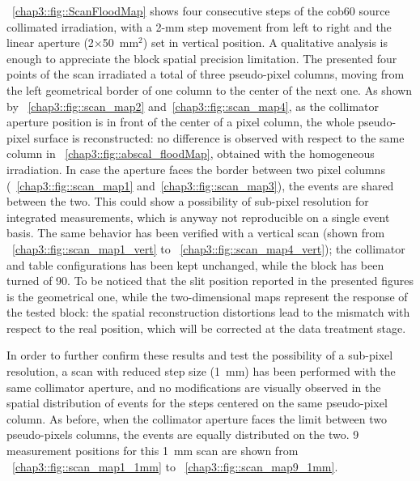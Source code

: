 \figurename~\ref{chap3::fig::ScanFloodMap} shows four consecutive steps of the \gls{cob60} source collimated irradiation, with a 2-mm step movement from left to right and the linear aperture (2$\times$50~mm$^2$) set in vertical position. A qualitative analysis is enough to appreciate the block spatial precision limitation. The presented four points of the scan irradiated a total of three pseudo-pixel columns, moving from the left geometrical border of one column to the center of the next one. As shown by \figurename~\ref{chap3::fig::scan_map2} and~\ref{chap3::fig::scan_map4}, as the collimator aperture position is in front of the center of a pixel column, the whole pseudo-pixel surface is reconstructed: no difference is observed with respect to the same column in \figurename~\ref{chap3::fig::abscal_floodMap}, obtained with the homogeneous irradiation. In case the aperture faces the border between two pixel columns (\figurename~\ref{chap3::fig::scan_map1} and~\ref{chap3::fig::scan_map3}), the events are shared between the two. This could show a possibility of sub-pixel resolution for integrated measurements, which is anyway not reproducible on a single event basis. The same behavior has been verified with a vertical scan (shown from \figurename~\ref{chap3::fig::scan_map1_vert} to \figurename~\ref{chap3::fig::scan_map4_vert}); the collimator and table configurations has been kept unchanged, while the block has been turned of 90\textdegree. To be noticed that the slit position reported in the presented figures is the geometrical one, while the two-dimensional maps represent the response of the tested block: the spatial reconstruction distortions lead to the mismatch with respect to the real position, which will be corrected at the data treatment stage.   
 
In order to further confirm these results and test the possibility of a sub-pixel resolution, a scan with reduced step size (1~mm) has been performed with the same collimator aperture, and no modifications are visually observed in the spatial distribution of events for the steps centered on the same pseudo-pixel column. As before, when the collimator aperture faces the limit between two pseudo-pixels columns, the events are equally distributed on the two. 9 measurement positions for this 1~mm scan are shown from \figurename~\ref{chap3::fig::scan_map1_1mm} to \figurename~\ref{chap3::fig::scan_map9_1mm}.
 

